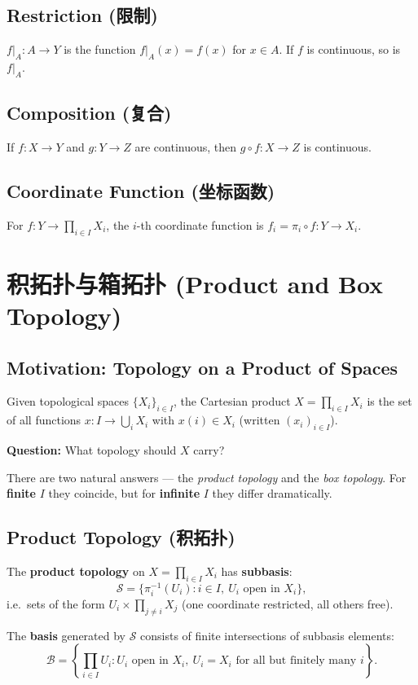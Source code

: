 \documentclass{article}
\begin{document}
\subsection{Restriction (限制)}\label{def:restriction}
$f|_A : A \to Y$ is the function $f|_A(x) = f(x)$ for $x \in A$. If
$f$ is continuous, so is $f|_A$.

\subsection{Composition (复合)}\label{def:composition}
If $f : X \to Y$ and $g : Y \to Z$ are continuous, then $g \circ f :
X \to Z$ is continuous.

\subsection{Coordinate Function (坐标函数)}\label{def:coordinate}
For $f : Y \to \prod_{i \in I} X_i$, the $i$-th coordinate function
is $f_i = \pi_i \circ f : Y \to X_i$.

\section{积拓扑与箱拓扑 (Product and Box Topology)}

\subsection{Motivation: Topology on a Product of Spaces}
Given topological spaces $\{X_i\}_{i \in I}$, the Cartesian product
$X = \prod_{i \in I} X_i$ is the set of all functions $x : I \to
\bigcup_{i} X_i$ with $x(i) \in X_i$ (written $(x_i)_{i \in I}$).

\textbf{Question:} What topology should $X$ carry?

There are two natural answers --- the \emph{product topology} and the
\emph{box topology}. For \textbf{finite} $I$ they coincide, but for
\textbf{infinite} $I$ they differ dramatically.

\subsection{Product Topology (积拓扑)}\label{def:product-topo}
\begin{definition}
  The \textbf{product topology} on $X = \prod_{i \in I} X_i$ has
  \textbf{subbasis}:
  \[
    \mathcal{S} = \{\pi_i^{-1}(U_i) : i \in I,\ U_i \text{ open in }
    X_i\},
  \]
  i.e.\ sets of the form $U_i \times \prod_{j \ne i} X_j$ (one
  coordinate restricted, all others free).

  The \textbf{basis} generated by $\mathcal{S}$ consists of finite
  intersections of subbasis elements:
  \[
    \mathcal{B} = \left\{\prod_{i \in I} U_i : U_i \text{ open in }
    X_i,\ U_i = X_i \text{ for all but finitely many } i\right\}.
  \]
\end{definition}
\end{document}
